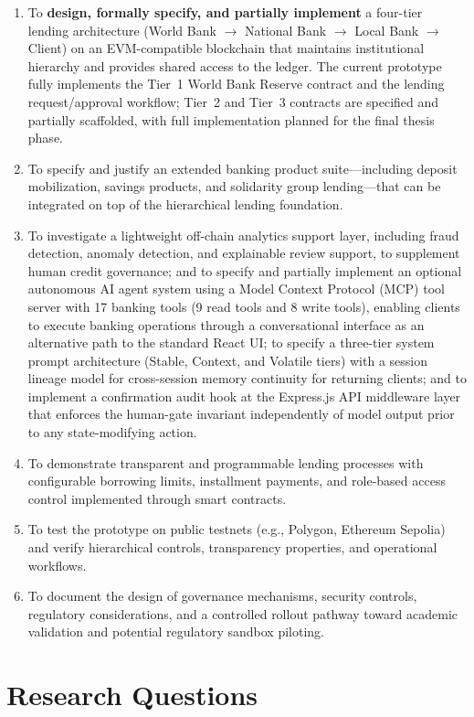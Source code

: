\documentclass[12pt,a4paper]{report}
\begin{document}
\begin{enumerate}[noitemsep]
\item To \textbf{design, formally specify, and partially implement} a four-tier lending architecture (World Bank $\to$ National Bank $\to$ Local Bank $\to$ Client) on an EVM-compatible blockchain that maintains institutional hierarchy and provides shared access to the ledger. The current prototype fully implements the Tier~1 World Bank Reserve contract and the lending request/approval workflow; Tier~2 and Tier~3 contracts are specified and partially scaffolded, with full implementation planned for the final thesis phase.
\item To specify and justify an extended banking product suite---including deposit mobilization, savings products, and solidarity group lending---that can be integrated on top of the hierarchical lending foundation.
\item To investigate a lightweight off-chain analytics support layer, including fraud detection, anomaly detection, and explainable review support, to supplement human credit governance; and to specify and partially implement an optional autonomous AI agent system using a Model Context Protocol (MCP) tool server with 17 banking tools (9 read tools and 8 write tools), enabling clients to execute banking operations through a conversational interface as an alternative path to the standard React UI; to specify a three-tier system prompt architecture (Stable, Context, and Volatile tiers) with a session lineage model for cross-session memory continuity for returning clients; and to implement a confirmation audit hook at the Express.js API middleware layer that enforces the human-gate invariant independently of model output prior to any state-modifying action.
\item To demonstrate transparent and programmable lending processes with configurable borrowing limits, installment payments, and role-based access control implemented through smart contracts.
\item To test the prototype on public testnets (e.g., Polygon, Ethereum Sepolia) and verify hierarchical controls, transparency properties, and operational workflows.
\item To document the design of governance mechanisms, security controls, regulatory considerations, and a controlled rollout pathway toward academic validation and potential regulatory sandbox piloting.
\end{enumerate}

\section{Research Questions}
\end{document}
